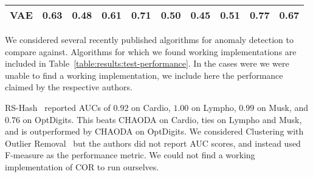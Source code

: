 \begin{table*}[!t]
\begin{center}
\begin{small}
\begin{sc}
\begin{tabular}{|c|c|c|c|c|c|c|c|c|c|}
\hline
                VAE &          0.63 &               0.48 &          0.61 &                0.71 &          0.50 &               0.45 &            0.51 &          0.77 &          0.67 \\
\hline
\hline
\end{tabular}
\end{sc}
\end{small}
\end{center}
\vskip -0.1in
\end{table*}


We considered several recently published algorithms for anomaly detection to compare against.
Algorithms for which we found working implementations are included in Table~\ref{table:results:test-performance}. %
In the cases were we were unable to find a working implementation, we include here the performance claimed by the respective authors.

RS-Hash~\cite{sathe2016subspace} reported AUCs of $0.92$ on Cardio, $1.00$ on Lympho, $0.99$ on Musk, and $0.76$ on OptDigits.
This beats CHAODA on Cardio, ties on Lympho and Musk, and is outperformed by CHAODA on OptDigits.
We considered Clustering with Outlier Removal~\cite{liu2019clustering} but the authors did not report AUC scores, and instead used F-measure as the performance metric.
We could not find a working implementation of COR to run ourselves.
